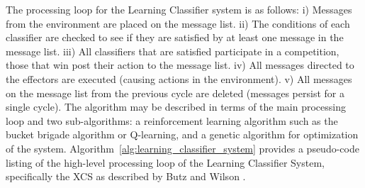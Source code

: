 The processing loop for the Learning Classifier system is as follows: i) Messages from the environment are placed on the message list. ii) The conditions of each classifier are checked to see if they are satisfied by at least one message in the message list. iii) All classifiers that are satisfied participate in a competition, those that win post their action to the message list. iv) All messages directed to the effectors are executed (causing actions in the environment). v) All messages on the message list from the previous cycle are deleted (messages persist for a single cycle).
The algorithm may be described in terms of the main processing loop and two sub-algorithms: a reinforcement learning algorithm such as the bucket brigade algorithm or Q-learning, and a genetic algorithm for optimization of the system.
Algorithm~\ref{alg:learning_classifier_system} provides a pseudo-code listing of the high-level processing loop of the Learning Classifier System, specifically the XCS as described by Butz and Wilson \cite{Butz2002a}. 

